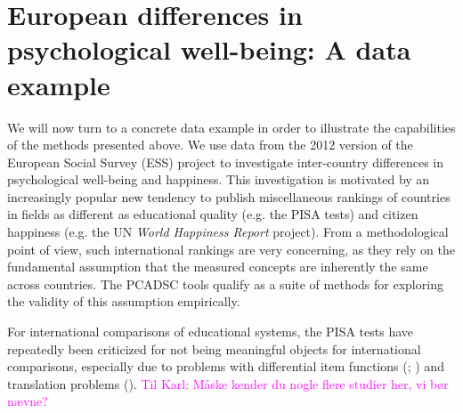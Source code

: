 \documentclass[titlepage,11pt,twoside]{article}
\newcommand{\hl}[1]{\textcolor{magenta}{#1}}
\begin{document}


\section{European differences in psychological well-being: A data example}
\label{sec:dataexample}
We will now turn to a concrete data example in order to illustrate the capabilities of the methods presented above. We use data from the 2012 version of the European Social Survey (ESS) project to investigate inter-country differences in psychological well-being and happiness. This investigation is motivated by an increasingly popular new tendency to publish miscellaneous rankings of countries in fields as different as educational quality (e.g. the PISA tests) and citizen happiness (e.g. the UN \textit{World Happiness Report} project). From a methodological point of view, such international rankings are very concerning, as they rely on the fundamental assumption  that the measured concepts are inherently the same across countries. The PCADSC tools qualify as a suite of methods for exploring the validity of this assumption empirically.

For international comparisons of educational systems, the PISA tests have repeatedly been criticized for not being meaningful objects for international comparisons, especially due to problems with differential item functions (\cite{Kankaras2014}; \cite{Kreiner2014}) and translation problems (\cite{Asil2016}). \hl{Til Karl: Måske kender du nogle flere studier her, vi bør nævne?}
\end{document}
